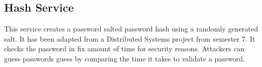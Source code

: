 \subsection{Hash Service}

\indent
\indent
This service creates a password salted password hash using a randomly generated salt. It has been adapted from a Distributed Systems project from semester 7.
It checks the password in fix amount of time for security reasons. Attackers can guess passwords guess by comparing the time it takes to validate a password.
\newpage